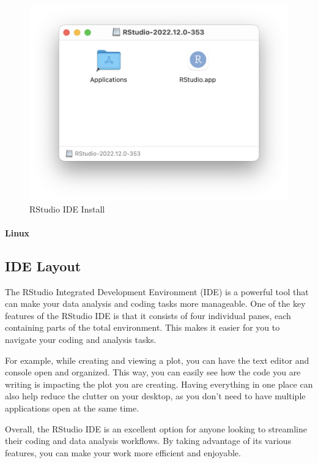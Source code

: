 \documentclass[
]{book}
\begin{document}
\begin{figure}
\includegraphics[width=13.58in]{images/02_011_rstudio_installer_mac} \caption{\label{fig:2011}RStudio IDE Install}\label{fig:2011}
\end{figure}

\hypertarget{linux-1}{%
\paragraph*{Linux}\label{linux-1}}

\hypertarget{ide-layout}{%
\subsection{IDE Layout}\label{ide-layout}}

The RStudio Integrated Development Environment (IDE) is a powerful tool that can make your data analysis and coding tasks more manageable. One of the key features of the RStudio IDE is that it consists of four individual panes, each containing parts of the total environment. This makes it easier for you to navigate your coding and analysis tasks.

For example, while creating and viewing a plot, you can have the text editor and console open and organized. This way, you can easily see how the code you are writing is impacting the plot you are creating. Having everything in one place can also help reduce the clutter on your desktop, as you don't need to have multiple applications open at the same time.

Overall, the RStudio IDE is an excellent option for anyone looking to streamline their coding and data analysis workflows. By taking advantage of its various features, you can make your work more efficient and enjoyable.
\end{document}
